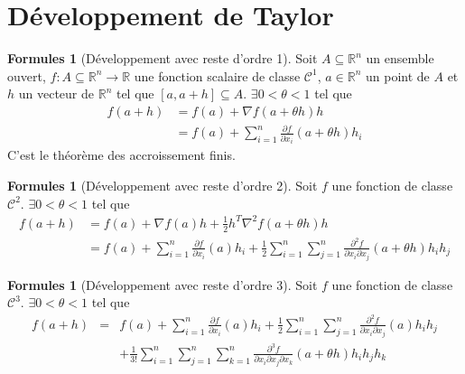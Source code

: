 \documentclass[11pt,a4paper]{article}
\theoremstyle{definition}
\newtheorem{myform}[mydef]{Formules}
\newcommand{\pa}{\partial}
\newcommand{\R}{\mathbb{R}}
\begin{document}

\section{Développement de Taylor}

\begin{myform}[Développement avec reste d'ordre 1]
	Soit $A \subseteq \R^n$ un ensemble ouvert, $f : A \subseteq \R^n \to \R$ une fonction scalaire de classe $\mathcal{C}^1$, $a \in \R^n$ un point de $A$ et $h$ un vecteur de $\R^n$ tel que $[a, a+h] \subseteq A$. $\exists 0 < \theta < 1$ tel que
	\begin{align*}
		f(a+h) & = f(a) + \nabla f(a+\theta h)h \\
		& = f(a) + \sum_{i =1}^n \frac{\pa f}{\pa x_i} (a+\theta h)h_i
	\end{align*}
	C'est le théorème des accroissement finis.
\end{myform}

\begin{myform}[Développement avec reste d'ordre 2]
	Soit $f$ une fonction de classe $\mathcal{C}^2$.
	$\exists 0 < \theta < 1$ tel que
	\begin{align*} f(a+h) & = f(a) + \nabla f(a) h + \frac12 h^T \nabla^2 f(a+\theta h) h \\
		& = f(a) + \sum_{i=1}^n \frac{\pa f}{\pa x_i}(a)h_i + \frac12 \sum_{i=1}^n \sum_{j=1}^n \frac{\pa^2 f}{\pa x_i \pa x_j} (a+ \theta h) h_i h_j
	\end{align*}
\end{myform}

\begin{myform}[Développement avec reste d'ordre 3]
	Soit $f$ une fonction de classe $\mathcal{C}^3$.
	$\exists 0 < \theta < 1$ tel que
	\begin{eqnarray*}
		f(a+h) &=& f(a) + \sum_{i=1}^n \frac{\pa f}{\pa x_i}(a)h_i
		+ \frac 12 \sum_{i=1}^n \sum_{j=1}^n \frac{\pa^2 f}{\pa x_i \pa x_j} (a) h_i h_j \\
		&& + \frac{1}{3!} \sum_{i=1}^n \sum_{j=1}^n \sum_{k=1}^n \frac{\pa^3 f}{\pa x_i \pa x_j \pa x_k}(a+\theta h)h_i h_j h_k
	\end{eqnarray*}
\end{myform}

\end{document}
